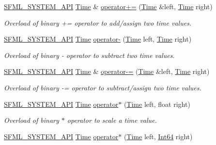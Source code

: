\begin{DoxyCompactItemize}
\hyperlink{sfml_2dep_2_s_f_m_l-2_84_82_2include_2_s_f_m_l_2_system_2_export_8hpp_a6476c9e422606477a4c23d92b1d79a1f}{S\-F\-M\-L\-\_\-\-S\-Y\-S\-T\-E\-M\-\_\-\-A\-P\-I} \hyperlink{classsf_1_1_time}{Time} \& \hyperlink{classsf_1_1_time_a831c8df4b7b9b47eaa0c5a52a1be654c}{operator+=} (\hyperlink{classsf_1_1_time}{Time} \&left, \hyperlink{classsf_1_1_time}{Time} right)
\begin{DoxyCompactList}\small\item\em Overload of binary += operator to add/assign two time values. \end{DoxyCompactList}\item 
\hyperlink{sfml_2dep_2_s_f_m_l-2_84_82_2include_2_s_f_m_l_2_system_2_export_8hpp_a6476c9e422606477a4c23d92b1d79a1f}{S\-F\-M\-L\-\_\-\-S\-Y\-S\-T\-E\-M\-\_\-\-A\-P\-I} \hyperlink{classsf_1_1_time}{Time} \hyperlink{classsf_1_1_time_ace92ab9bc7aec80239af7218cd89cc80}{operator-\/} (\hyperlink{classsf_1_1_time}{Time} left, \hyperlink{classsf_1_1_time}{Time} right)
\begin{DoxyCompactList}\small\item\em Overload of binary -\/ operator to subtract two time values. \end{DoxyCompactList}\item 
\hyperlink{sfml_2dep_2_s_f_m_l-2_84_82_2include_2_s_f_m_l_2_system_2_export_8hpp_a6476c9e422606477a4c23d92b1d79a1f}{S\-F\-M\-L\-\_\-\-S\-Y\-S\-T\-E\-M\-\_\-\-A\-P\-I} \hyperlink{classsf_1_1_time}{Time} \& \hyperlink{classsf_1_1_time_aaf7888302cf4847f97cfc26875367b94}{operator-\/=} (\hyperlink{classsf_1_1_time}{Time} \&left, \hyperlink{classsf_1_1_time}{Time} right)
\begin{DoxyCompactList}\small\item\em Overload of binary -\/= operator to subtract/assign two time values. \end{DoxyCompactList}\item 
\hyperlink{sfml_2dep_2_s_f_m_l-2_84_82_2include_2_s_f_m_l_2_system_2_export_8hpp_a6476c9e422606477a4c23d92b1d79a1f}{S\-F\-M\-L\-\_\-\-S\-Y\-S\-T\-E\-M\-\_\-\-A\-P\-I} \hyperlink{classsf_1_1_time}{Time} \hyperlink{classsf_1_1_time_ac1386c6360872d354b9b59eadcd9778d}{operator$\ast$} (\hyperlink{classsf_1_1_time}{Time} left, float right)
\begin{DoxyCompactList}\small\item\em Overload of binary $\ast$ operator to scale a time value. \end{DoxyCompactList}\item 
\hyperlink{sfml_2dep_2_s_f_m_l-2_84_82_2include_2_s_f_m_l_2_system_2_export_8hpp_a6476c9e422606477a4c23d92b1d79a1f}{S\-F\-M\-L\-\_\-\-S\-Y\-S\-T\-E\-M\-\_\-\-A\-P\-I} \hyperlink{classsf_1_1_time}{Time} \hyperlink{classsf_1_1_time_acd021b3ebb108053d7dec56869e27385}{operator$\ast$} (\hyperlink{classsf_1_1_time}{Time} left, \hyperlink{namespacesf_a2840579fed3494d9f330baf7a5a19903}{Int64} right)

\end{DoxyCompactItemize}
